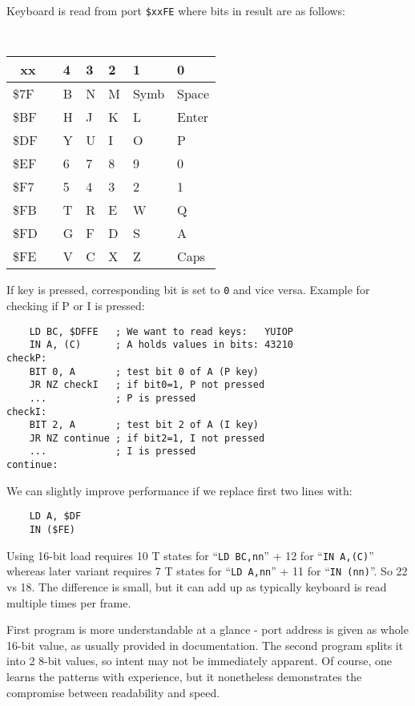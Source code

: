 \documentclass[12pt,twoside,openright,a4paper]{book}
\newcommand{\instrt}{\rule{0pt}{2.5ex}}
\newcommand{\instrb}{\rule[-1.4ex]{0pt}{0pt}}
\begin{document}
Keyboard is read from port {\tt \$xxFE} where bits in result are as follows:

{
	\tt
	\setlength{\extrarowheight}{0pt}
	\def\arraystretch{0.1}
	
	\begin{tabular}{p{0.7cm}|cp{1cm}p{1cm}p{1cm}p{1.3cm}p{1.5cm}}

		~xx & & 4 & 3 & 2 & 1 & 0 \instrb \\
		\hline
		\$7F\instrt & & B & N & M & Symb & Space \\
		\$BF\instrt & & H & J & K & L & Enter \\
		\$DF\instrt & & Y & U & I & O & P \\
		\$EF\instrt & & 6 & 7 & 8 & 9 & 0 \\
		\$F7\instrt & & 5 & 4 & 3 & 2 & 1 \\
		\$FB\instrt & & T & R & E & W & Q \\
		\$FD\instrt & & G & F & D & S & A \\
		\$FE\instrt\instrb & & V & C & X & Z & Caps \\

	\end{tabular}
}

If key is pressed, corresponding bit is set to {\tt 0} and vice versa. Example for checking if P or I is pressed:
	
\begin{Verbatim}
	LD BC, $DFFE   ; We want to read keys:   YUIOP
	IN A, (C)      ; A holds values in bits: 43210
checkP:
	BIT 0, A       ; test bit 0 of A (P key)
	JR NZ checkI   ; if bit0=1, P not pressed
	...            ; P is pressed
checkI:
	BIT 2, A       ; test bit 2 of A (I key)
	JR NZ continue ; if bit2=1, I not pressed
	...            ; I is pressed
continue:
\end{Verbatim}

We can slightly improve performance if we replace first two lines with:

\begin{Verbatim}
	LD A, $DF
	IN ($FE)
\end{Verbatim}

Using 16-bit load requires 10 T states for ``{\tt LD BC,nn}'' + 12 for ``{\tt IN A,(C)}'' whereas later variant requires 7 T states for ``{\tt LD A,nn}'' + 11 for ``{\tt IN (nn)}''. So 22 vs 18. The difference is small, but it can add up as typically keyboard is read multiple times per frame.

First program is more understandable at a glance - port address is given as whole 16-bit value, as usually provided in documentation. The second program splits it into 2 8-bit values, so intent may not be immediately apparent. Of course, one learns the patterns with experience, but it nonetheless demonstrates the compromise between readability and speed.
\end{document}
